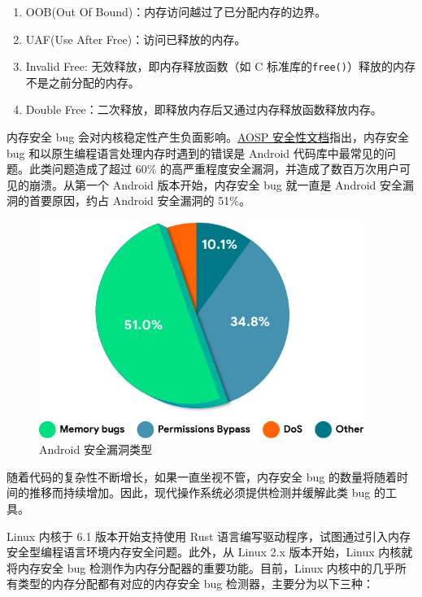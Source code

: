 \documentclass[AutoFakeBold]{LZUThesis}
\begin{document}
\begin{sloppypar}
\begin{enumerate}
\def\labelenumi{\arabic{enumi}.}
\item
  OOB(Out Of Bound)：内存访问越过了已分配内存的边界。
\item
  UAF(Use After Free)：访问已释放的内存。
\item
  Invalid Free: 无效释放，即内存释放函数（如 C
  标准库的\texttt{free()}）释放的内存不是之前分配的内存。
\item
  Double Free：二次释放，即释放内存后又通过内存释放函数释放内存。
\end{enumerate}

内存安全 bug
会对内核稳定性产生负面影响。\href{https://source.android.google.cn/docs/security/memory-safety?hl=zh-cn}{AOSP
安全性文档}指出，内存安全 bug 和以原生编程语言处理内存时遇到的错误是
Android 代码库中最常见的问题。此类问题造成了超过 60\%
的高严重程度安全漏洞，并造成了数百万次用户可见的崩溃。从第一个 Android
版本开始，内存安全 bug 就一直是 Android 安全漏洞的首要原因，约占 Android
安全漏洞的 51\%。

\begin{figure}
\centering
\includegraphics[width=300pt]{images/Android-security-report.png}
\caption{Android 安全漏洞类型}
\end{figure}

随着代码的复杂性不断增长，如果一直坐视不管，内存安全 bug
的数量将随着时间的推移而持续增加。因此，现代操作系统必须提供检测并缓解此类
bug 的工具。

Linux 内核于 6.1 版本开始支持使用 Rust
语言编写驱动程序，试图通过引入内存安全型编程语言环境内存安全问题。此外，从
Linux 2.x 版本开始，Linux 内核就将内存安全 bug
检测作为内存分配器的重要功能。目前，Linux
内核中的几乎所有类型的内存分配都有对应的内存安全 bug
检测器，主要分为以下三种：


\end{sloppypar}
\end{document}
